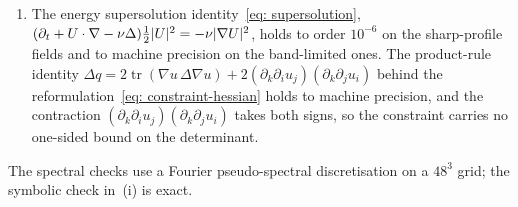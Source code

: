 \begin{enumerate}
        for the determinant, the curvature work, and
        $\operatorname{tr}(\nabla u\,\Delta\nabla u)$, hold to machine precision.
  \item The energy supersolution identity~\eqref{eq: supersolution},
        $(\partial_t + U\cdot\nabla - \nu\Delta)\tfrac12\lvert U \rvert^2
        = -\nu\lvert \nabla U \rvert^2$, holds to order $10^{-6}$ on the sharp-profile
        fields and to machine precision on the band-limited ones. The product-rule
        identity $\Delta q = 2\operatorname{tr}(\nabla u\,\Delta\nabla u)
        + 2(\partial_k\partial_i u_j)(\partial_k\partial_j u_i)$ behind the
        reformulation~\eqref{eq: constraint-hessian} holds to machine precision, and
        the contraction $(\partial_k\partial_i u_j)(\partial_k\partial_j u_i)$ takes
        both signs, so the constraint carries no one-sided bound on the determinant.
\end{enumerate}
The spectral checks use a Fourier pseudo-spectral discretisation on a
$48^3$ grid; the symbolic check in~(i) is exact.

